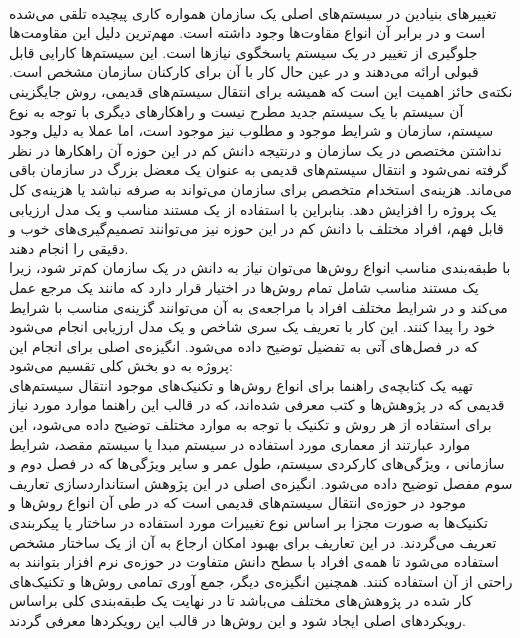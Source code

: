 \\
تغییرهای بنیادین در سیستم‌های اصلی یک سازمان همواره کاری پیچیده تلقی می‌شده است و در برابر آن انواع مقاوت‌ها وجود داشته است. مهم‌ترین دلیل این مقاومت‌ها جلوگیری از تغییر در یک سیستم پاسخگوی نیازها است. این سیستم‌ها کارایی قابل قبولی ارائه می‌دهند و در عین حال کار با آن برای کارکنان سازمان مشخص است. نکته‌ی حائز اهمیت این است که همیشه برای انتقال سیستم‌های قدیمی، روش جایگزینی آن سیستم با یک سیستم جدید مطرح نیست و راهکارهای دیگری با توجه به نوع سیستم، سازمان و شرایط موجود و مطلوب نیز موجود است، اما عملا به دلیل وجود نداشتن مختصص در یک سازمان و درنتیجه دانش کم در این حوزه  آن راهکارها در نظر  گرفته
نمی‌شود و انتقال سیستم‌های قدیمی به عنوان یک معضل بزرگ در سازمان باقی می‌ماند. هزینه‌ی استخدام متخصص برای سازمان می‌تواند به صرفه نباشد یا هزینه‌ی کل یک پروژه را افزایش دهد. بنابراین با استفاده از یک مستند مناسب و یک مدل ارزیابی قابل فهم، افراد مختلف با دانش کم در این حوزه نیز می‌توانند تصمیم‌گیری‌های خوب و دقیقی را انجام دهند.
\\
 با طبقه‌بندی مناسب انواع روش‌ها می‌توان نیاز به دانش در یک سازمان کم‌تر شود، زیرا یک مستند مناسب شامل تمام روش‌ها در اختیار قرار دارد که مانند یک مرجع عمل می‌کند و در شرایط مختلف افراد با مراجعه‌ی به آن می‌توانند گزینه‌ی مناسب با  شرایط خود را پیدا کنند. این کار با تعریف یک سری شاخص و  یک مدل ارزیابی انجام می‌شود که در فصل‌های آتی به تفضیل توضیح داده می‌شود.
انگیزه‌ی اصلی برای  انجام این  پروژه به دو بخش کلی تقسیم می‌شود:
\\
تهیه یک کتابچه‌ی راهنما برای انواع روش‌ها و تکنیک‌های موجود انتقال سیستم‌های قدیمی که در پژوهش‌ها و کتب معرفی شده‌اند، که در قالب  این راهنما موارد مورد نیاز برای استفاده از هر روش و تکنیک با توجه به موارد مختلف توضیح داده می‌شود، این موارد عبارتند از  معماری مورد استفاده در سیستم مبدا یا سیستم مقصد، شرایط سازمانی ، ویژگی‌های کارکردی سیستم، طول عمر و سایر ویژگی‌ها که در فصل دوم و سوم مفصل توضیح داده می‌شود. انگیزه‌ی اصلی در این پژوهش استانداردسازی تعاریف موجود در حوزه‌ی انتقال سیستم‌های قدیمی است که در طی آن انواع روش‌ها و تکنیک‌ها به صورت مجزا بر اساس نوع تغییرات مورد استفاده در ساختار یا پیکربندی تعریف می‌گردند. در این تعاریف برای بهبود امکان ارجاع به آن از یک ساختار مشخص استفاده می‌شود تا همه‌ی افراد با سطح دانش متفاوت در حوزه‌ی نرم افزار بتوانند به راحتی از آن استفاده کنند. همچنین انگیزه‌ی دیگر، جمع آوری تمامی روش‌ها و تکنیک‌های کار شده در پژوهش‌های مختلف می‌باشد تا  در نهایت یک طبقه‌بندی کلی براساس رویکردهای اصلی ایجاد شود و این روش‌ها در قالب این رویکردها معرفی گردند.
\\
